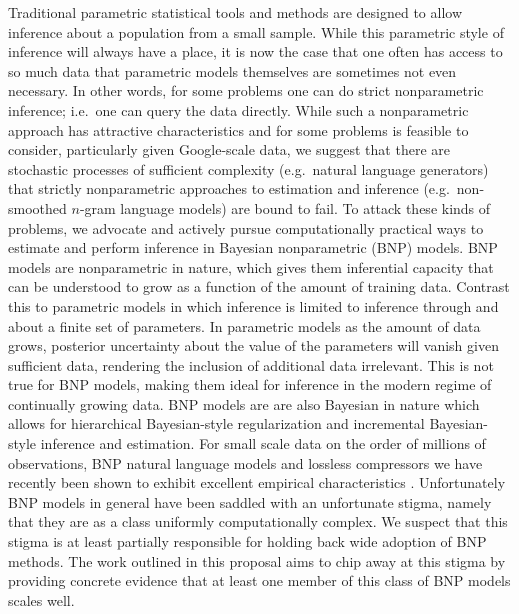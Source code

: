 \documentclass[10pt]{article}
\begin{document}
Traditional parametric statistical tools and methods are designed to allow
inference about a population from a small sample.
While this parametric style of inference will always have a place, it is now the
case that one often has access to so much data that parametric models
themselves are sometimes not even necessary.  In other words, for some problems one can do strict nonparametric inference; i.e.~one can query
the data directly.  While such a nonparametric approach has attractive characteristics and  for some problems is feasible to consider, particularly given Google-scale data, we suggest that there are stochastic processes of sufficient complexity (e.g.~natural language generators) that strictly nonparametric approaches to estimation and inference (e.g.~non-smoothed $n$-gram language models) are bound to fail.  To attack these kinds of problems, we advocate and actively pursue computationally practical ways to estimate and perform inference in Bayesian nonparametric (BNP) models.   BNP models are nonparametric in nature, which gives them inferential capacity that can be understood to grow as a function of the amount of training data. Contrast this to parametric models in which inference is limited to inference through and about a finite set of parameters.   In parametric models as the amount of data grows, posterior uncertainty about the value of the parameters will vanish given sufficient data, rendering the inclusion of additional data irrelevant.  This is not true for BNP models, making them ideal for inference in the modern regime of continually growing data.  BNP models are are also Bayesian in nature which allows for hierarchical Bayesian-style regularization and incremental Bayesian-style inference and estimation.  For small scale data on the order of millions of observations, BNP natural language models and lossless compressors we have recently been shown to exhibit excellent empirical characteristics \citep{Teh2006a,Wood2009,Gasthaus2010}.  Unfortunately BNP models in general have been saddled with an unfortunate stigma, namely that they are as a class uniformly computationally complex. We suspect that this stigma is at least partially responsible for holding back wide adoption of BNP methods.   The work outlined in this proposal aims to chip away at this stigma by providing concrete evidence that at least one member of this class of BNP models scales well.

\vspace{.2cm}
\vspace{.2cm}
\end{document}
